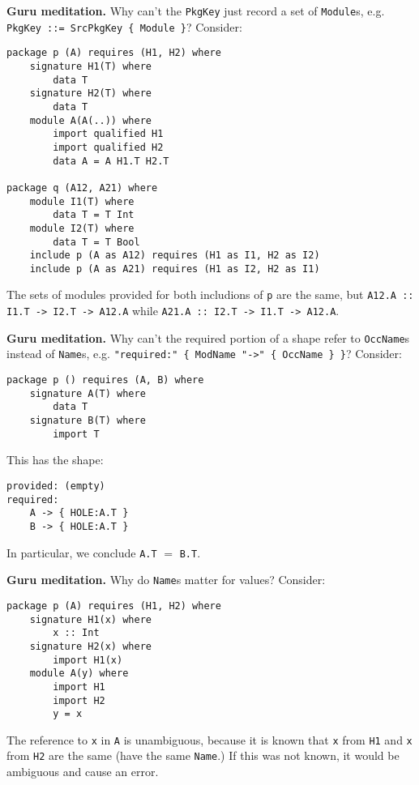 \documentclass{article}
\newenvironment{aside}
  {\begin{mdframed}[style=0,%
      leftline=false,rightline=false,leftmargin=2em,rightmargin=2em,%
          innerleftmargin=0pt,innerrightmargin=0pt,linewidth=0.75pt,%
      skipabove=7pt,skipbelow=7pt]\small}
  {\end{mdframed}}
\begin{document}
\begin{aside}
\textbf{Guru meditation.} Why can't the \verb|PkgKey| just record a
set of \verb|Module|s, e.g. \verb|PkgKey ::= SrcPkgKey { Module }|?  Consider:

\begin{verbatim}
package p (A) requires (H1, H2) where
    signature H1(T) where
        data T
    signature H2(T) where
        data T
    module A(A(..)) where
        import qualified H1
        import qualified H2
        data A = A H1.T H2.T

package q (A12, A21) where
    module I1(T) where
        data T = T Int
    module I2(T) where
        data T = T Bool
    include p (A as A12) requires (H1 as I1, H2 as I2)
    include p (A as A21) requires (H1 as I2, H2 as I1)
\end{verbatim}

The sets of modules provided for both includions of \verb|p| are the same,
but \verb|A12.A :: I1.T -> I2.T -> A12.A| while \verb|A21.A :: I2.T -> I1.T -> A12.A|.
\end{aside}

\newpage

\begin{aside}
\textbf{Guru meditation.} Why can't the required portion of a shape
refer to \verb|OccName|s instead of \verb|Name|s, e.g. \verb|"required:" { ModName "->" { OccName } }|?  Consider:

\begin{verbatim}
package p () requires (A, B) where
    signature A(T) where
        data T
    signature B(T) where
        import T
\end{verbatim}

This has the shape:

\begin{verbatim}
provided: (empty)
required:
    A -> { HOLE:A.T }
    B -> { HOLE:A.T }
\end{verbatim}

In particular, we conclude \verb|A.T| $=$ \verb|B.T|.
\end{aside}

\begin{aside}
\textbf{Guru meditation.} Why do \verb|Name|s matter for values?  Consider:

\begin{verbatim}
package p (A) requires (H1, H2) where
    signature H1(x) where
        x :: Int
    signature H2(x) where
        import H1(x)
    module A(y) where
        import H1
        import H2
        y = x
\end{verbatim}

The reference to \verb|x| in \verb|A| is unambiguous, because it is known
that \verb|x| from \verb|H1| and \verb|x| from \verb|H2| are the same (have
the same \verb|Name|.)  If this was not known, it would be ambiguous and
cause an error.
\end{aside}
\end{document}
